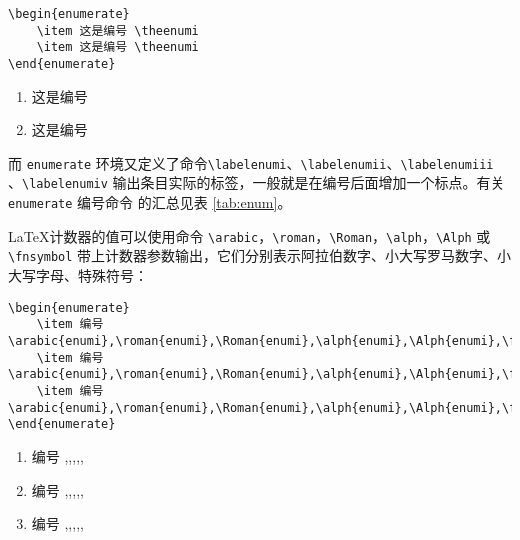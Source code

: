 \begin{minipage}[t]{0.45\textwidth}
\begin{lstlisting}
\begin{enumerate}
    \item 这是编号 \theenumi
    \item 这是编号 \theenumi
\end{enumerate}
\end{lstlisting}
\end{minipage}
\hfill
\begin{minipage}[t]{0.45\textwidth}
    \begin{enumerate}
        \item 这是编号 
        \item 这是编号 
    \end{enumerate}
\end{minipage}

而 \verb|enumerate| 环境又定义了命令\verb|\labelenumi|、\verb|\labelenumii|、\verb|\labelenumiii| 、\verb|\labelenumiv|
输出条目实际的标签，一般就是在编号后面增加一个标点。有关 \verb|enumerate| 编号命令
的汇总见表 \ref{tab:enum}。

\LaTeX 计数器的值可以使用命令 \verb|\arabic|，\verb|\roman|，\verb|\Roman|，\verb|\alph|，\verb|\Alph| 或 \verb|\fnsymbol| 带上计数器参数输出，它们分别表示阿拉伯数字、小大写罗马数字、小大写字母、特殊符号：

\begin{minipage}[t]{0.45\textwidth}
\begin{lstlisting}
\begin{enumerate}
    \item 编号 \arabic{enumi},\roman{enumi},\Roman{enumi},\alph{enumi},\Alph{enumi},\fnsymbol{enumi}
    \item 编号 \arabic{enumi},\roman{enumi},\Roman{enumi},\alph{enumi},\Alph{enumi},\fnsymbol{enumi}
    \item 编号 \arabic{enumi},\roman{enumi},\Roman{enumi},\alph{enumi},\Alph{enumi},\fnsymbol{enumi}
\end{enumerate}
\end{lstlisting}
\end{minipage}
\hfill
\begin{minipage}[t]{0.45\textwidth}
    \begin{enumerate}
        \item 编号 ,,,,,
        \item 编号 ,,,,,
        \item 编号 ,,,,,
    \end{enumerate}
\end{minipage}

